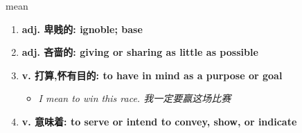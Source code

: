 
\begin{frame}
{\huge mean}
\begin{center}
\begin{enumerate}\Large
  \item \textbf{adj. 卑贱的: ignoble; base}
  \item \textbf{adj. 吝啬的: giving or sharing as little as possible}
  \item \textbf{v. 打算,怀有目的: to have in mind as a purpose or goal}
  \begin{itemize}
    \item \em{\Large{I mean to win this race. 我一定要赢这场比赛}}
  \end{itemize}
  \item \textbf{v. 意味着: to serve or intend to convey, show, or indicate}
\end{enumerate}
\end{center}
\end{frame}
